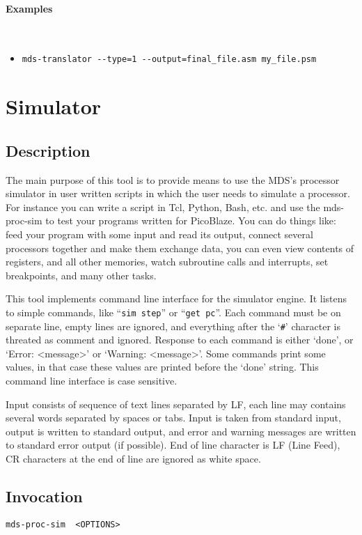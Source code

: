     \paragraph{Examples}~\\
        \begin{itemize}
            \item \verb'mds-translator --type=1 --output=final_file.asm my_file.psm'\\
        \end{itemize}

\clearpage
\section{Simulator}
    \subsection{Description}
        The main purpose of this tool is to provide means to use the MDS's processor simulator in user written scripts in which the user needs to simulate a processor. For instance you can write a script in Tcl, Python, Bash, etc. and use the mds-proc-sim to test your programs written for PicoBlaze. You can do things like: feed your program with some input and read its output, connect several processors together and make them exchange data, you can even view contents of registers, and all other memories, watch subroutine calls and interrupts, set breakpoints, and many other tasks.

        This tool implements command line interface for the simulator engine. It listens to simple commands, like ``\texttt{sim~step}'' or ``\texttt{get~pc}''. Each command must be on separate line, empty lines are ignored, and everything after the `\texttt{\#}' character is threated as comment and ignored. Response to each command is either `done', or `Error: <message>' or `Warning: <message>'. Some commands print some values, in that case these values are printed before the `done' string. This command line interface is case sensitive.

        Input consists of sequence of text lines separated by LF, each line may contains several words separated by spaces or tabs. Input is taken from standard input, output is written to standard output, and error and warning messages are written to standard error output (if possible). End of line character is LF (Line Feed), CR characters at the end of line are ignored as white space.

    \subsection{Invocation}
        \verb'mds-proc-sim  <OPTIONS>'

